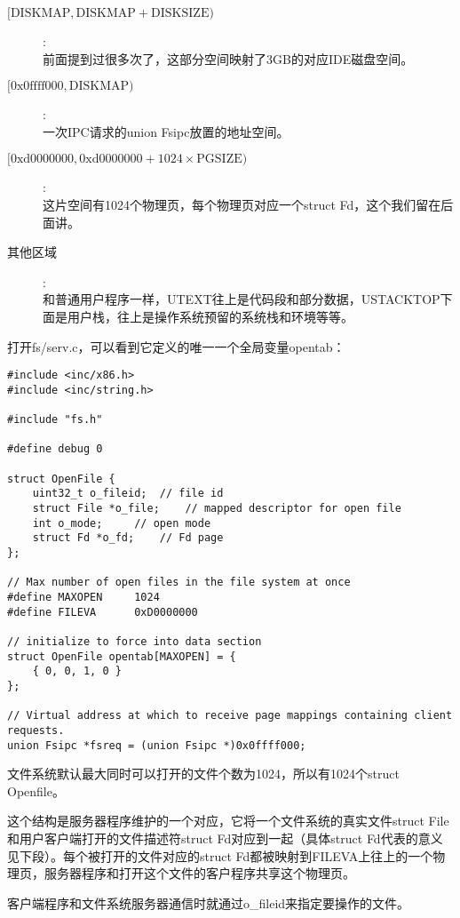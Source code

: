 \documentclass{article}
\begin{document}
\begin{CJK*}{UTF8}{gkai}
\begin{description}
\item[$[\mathrm{DISKMAP}, \mathrm{DISKMAP} + \mathrm{DISKSIZE})$]: \\
前面提到过很多次了，这部分空间映射了3GB的对应IDE磁盘空间。
\item[$[\mathrm{0x0ffff000}, \mathrm{DISKMAP})$]: \\
一次IPC请求的union Fsipc放置的地址空间。
\item[$[\mathrm{0xd0000000}, \mathrm{0xd0000000} + 1024 \times \mathrm{PGSIZE})$]: \\
这片空间有1024个物理页，每个物理页对应一个struct Fd，这个我们留在后面讲。
\item[其他区域]:\\
和普通用户程序一样，UTEXT往上是代码段和部分数据，USTACKTOP下面是用户栈，往上是操作系统预留的系统栈和环境等等。
\end{description}

打开fs/serv.c，可以看到它定义的唯一一个全局变量opentab：

\begin{lstlisting}[style=ccode, title={\scriptsize \ttfamily \bfseries fs/serv.c}]
#include <inc/x86.h>
#include <inc/string.h>

#include "fs.h"

#define debug 0

struct OpenFile {
	uint32_t o_fileid;	// file id
	struct File *o_file;	// mapped descriptor for open file
	int o_mode;		// open mode
	struct Fd *o_fd;	// Fd page
};

// Max number of open files in the file system at once
#define MAXOPEN		1024
#define FILEVA		0xD0000000

// initialize to force into data section
struct OpenFile opentab[MAXOPEN] = {
	{ 0, 0, 1, 0 }
};

// Virtual address at which to receive page mappings containing client requests.
union Fsipc *fsreq = (union Fsipc *)0x0ffff000;
\end{lstlisting}

文件系统默认最大同时可以打开的文件个数为1024，所以有1024个struct Openfile。

这个结构是服务器程序维护的一个对应，它将一个文件系统的真实文件struct File和用户客户端打开的文件描述符struct Fd对应到一起（具体struct Fd代表的意义见下段）。每个被打开的文件对应的struct Fd都被映射到FILEVA上往上的一个物理页，服务器程序和打开这个文件的客户程序共享这个物理页。

客户端程序和文件系统服务器通信时就通过o\_fileid来指定要操作的文件。


\end{CJK*}
\end{document}
